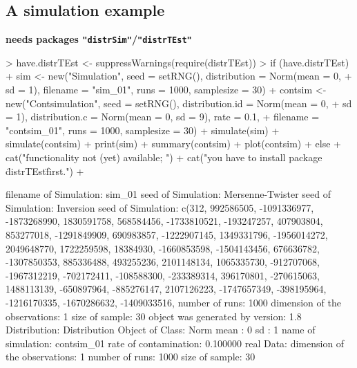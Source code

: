 \documentclass[11pt]{article}
\newcommand{\pkg}[1]{{\tt "#1"}}
\begin{document}
\subsection{A simulation example}\label{simex}
{\bf needs packages \pkg{distrSim}/\pkg{distrTEst}}\\[2ex]
\begin{Schunk}
\begin{Sinput}
> have.distrTEst <- suppressWarnings(require(distrTEst))
> if (have.distrTEst) {
+     sim <- new("Simulation", seed = setRNG(), distribution = Norm(mean = 0, 
+         sd = 1), filename = "sim_01", runs = 1000, samplesize = 30)
+     contsim <- new("Contsimulation", seed = setRNG(), distribution.id = Norm(mean = 0, 
+         sd = 1), distribution.c = Norm(mean = 0, sd = 9), rate = 0.1, 
+         filename = "contsim_01", runs = 1000, samplesize = 30)
+     simulate(sim)
+     simulate(contsim)
+     print(sim)
+     summary(contsim)
+     plot(contsim)
+ } else {
+     cat("\n functionality not (yet) available; ")
+     cat("you have to install package \"distrTEst\" first.\n")
+ }
\end{Sinput}
\begin{Soutput}
filename of Simulation: sim_01
seed of Simulation: Mersenne-Twister
 seed of Simulation: Inversion
 seed of Simulation: c(312, 992586505, -1091336977, -1873268990, 1830591758, 568584456, -1733810521, -193247257, 407903804, 853277018, -1291849909, 690983857, -1222907145, 1349331796, -1956014272, 2049648770, 1722259598, 18384930, -1660853598, -1504143456, 676636782, -1307850353, 885336488, 493255236, 2101148134, 1065335730, -912707068, -1967312219, -702172411, -108588300, -233389314, 396170801, -270615063, 1488113139, -650897964, -885276147, 2107126223, -1747657349, -398195964, -1216170335, -1670286632, -1409033516, 
number of runs: 1000
dimension of the observations: 1
size of sample: 30
object was generated by version: 1.8
Distribution:
Distribution Object of Class: Norm
mean :  0 
sd :  1 
name of simulation: contsim_01
rate of contamination: 0.100000
real Data:
dimension of the observations: 1
number of runs: 1000
size of sample: 30
\end{Soutput}
\end{Schunk}
\end{document}
